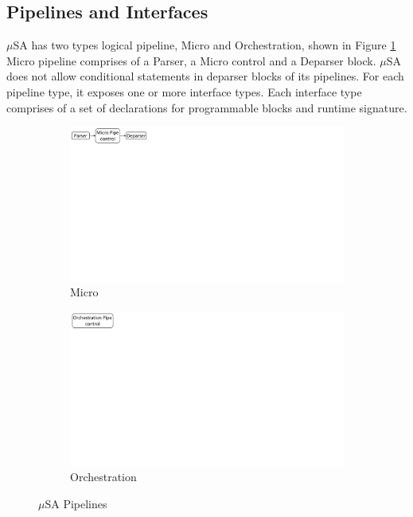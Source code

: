 \subsection{Pipelines and Interfaces}
\label{subsection:pipelines}
$\mu$SA has two types logical pipeline, Micro and Orchestration, shown in Figure \ref{fig:msa-pipelines}
Micro pipeline comprises of a Parser, a Micro control and a Deparser block.
$\mu$SA does not allow conditional statements in deparser blocks of its pipelines.
For each pipeline type, it exposes one or more interface types.
Each interface type comprises of a set of declarations for programmable blocks and runtime signature.
\begin{figure}
    \centering
    \begin{subfigure}{0.59\linewidth}
        \centering
        \includegraphics[trim=0 482 692 0, clip,scale=0.45]{msa-pipeline}
        \caption{Micro}
    \end{subfigure}\vline
    \begin{subfigure}{0.41\linewidth}
        \centering
        \includegraphics[trim=0 480 805 0,clip,scale=0.45]{micro-orchestration-pipeline}
        \caption{Orchestration}
    \end{subfigure}
\caption{$\mu$SA Pipelines}
\label{fig:msa-pipelines}
\end{figure}
